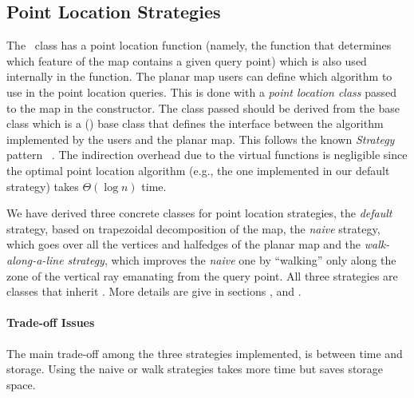 \begin{ccAdvanced}
\subsection*{Point Location Strategies}
The \ccClassTemplateName\ class has a point location function
(namely, the  function that determines which feature of the map 
contains a given query point)
which is also used internally in the  function.
The planar map users can define which algorithm to use in the
point location queries. This is done with a {\em point location class}
passed to the map in the constructor. The class passed should be derived
from the base class  which is a
() base class that defines the interface between the 
algorithm
implemented by the users and the planar map. This follows the 
known {\it Strategy}
pattern ~\cite{ghjv-dpero-95}. The indirection overhead due to the virtual functions is
negligible since the optimal point location algorithm 
(e.g., the one implemented in our default strategy) takes $\Theta(\log n)$ time.  

We have derived three concrete classes for point location strategies,
the {\it default\/} strategy, based on trapezoidal decomposition of the map,
the {\it naive\/} strategy, which goes over all the vertices and halfedges
of the planar map and the {\it walk-along-a-line strategy\/}, which improves
the {\it naive\/} one by ``walking'' only along the zone of the vertical ray emanating
from the query point. All three strategies are classes
that inherit .
More details are give in sections 
  , 
   and
  .


\paragraph{Trade-off Issues}
The main trade-off among the three strategies implemented, is between
time and storage. Using the naive or walk strategies takes more
time but saves storage space.


\end{ccAdvanced}
